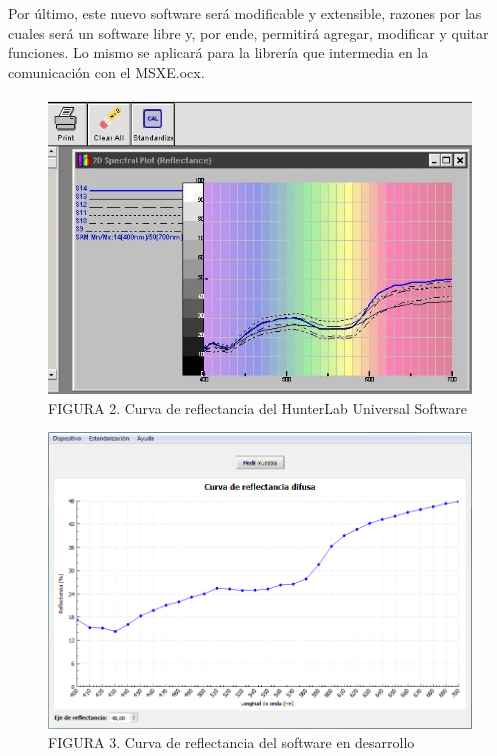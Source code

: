 \documentclass[conference]{IEEEtran}
\begin{document}
	Por \'{u}ltimo, este nuevo software ser\'{a} modificable y extensible, razones por las cuales ser\'{a} un software libre y, por ende, permitir\'{a} agregar, modificar y quitar funciones. Lo mismo se aplicar\'{a} para la librer\'{i}a que intermedia en la comunicaci\'{o}n con el MSXE.ocx.
		
		\begin{figure}[H]
			\centering
			\label{figura_2}
			\includegraphics[scale=0.56]{img/HunterLabSoftware}
			\caption{FIGURA 2. Curva de reflectancia del HunterLab Universal Software}
		\end{figure}
	
		\begin{figure}[H]
			\centering
			\label{figura_3}
			\includegraphics[scale=0.37]{img/nuevoSoftware}
			\caption{FIGURA 3. Curva de reflectancia del software en desarrollo}
		\end{figure}
	
\end{document}
